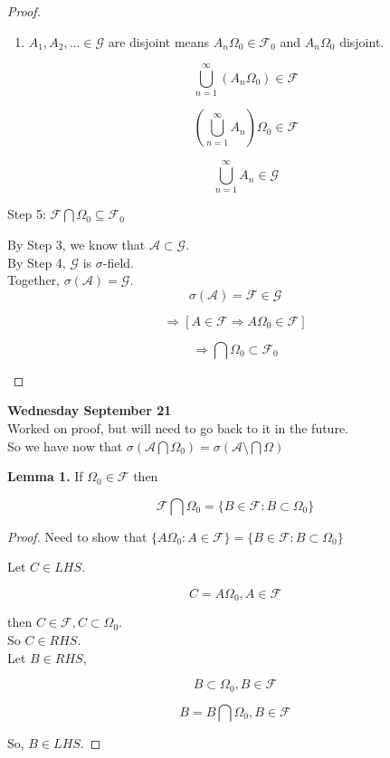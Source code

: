 \documentclass[11pt,fleqn]{book} %
\begin{document}
\begin{proof}
\begin{enumerate}[label = (\roman*)]
\begin{enumerate}
					\item $A_1,A_2, \dots \in \mathcal{G}$ are disjoint means $A_n\Omega_0 \in \mathcal{F}_0$ and $A_n\Omega_0$ disjoint.

						$$\bigcup^\infty_{n=1} (A_n \Omega_0) \in \mathcal{F} $$


						$$(\bigcup^\infty_{n=1} A_n) \Omega_0 \in \mathcal{F} $$

						$$\bigcup^\infty_{n=1} A_n \in \mathcal{G} $$


				\end{enumerate}
				

			Step 5: $\mathcal{F} \bigcap \Omega_0 \subseteq \mathcal{F}_0$

			By Step 3, we know that $\mathcal{A} \subset \mathcal{G}$.\\

			By Step 4, $\mathcal{G}$ is $\sigma$-field.\\

			Together, $\sigma(\mathcal{A}) = \mathcal{G}$.\\

			$$\sigma(\mathcal{A}) = \mathcal{F} \in \mathcal{G} $$

			$$\Rightarrow [A \in \mathcal{F} \Rightarrow A \Omega_0 \in \mathcal{F}] $$

			$$\Rightarrow \bigcap \Omega_0 \subset \mathcal{F}_0$$


	\end{enumerate}
\end{proof} 

\textbf{Wednesday September 21}\\

Worked on proof, but will need to go back to it in the future. \\


So we have now that $\sigma(\mathcal{A} \bigcap \Omega_0) = \sigma(\mathcal{A} \setminus \bigcap \Omega)$

\textbf{Lemma 1.} If $\Omega_0 \in \mathcal{F}$ then

	$$\mathcal{F} \bigcap \Omega_0 = \{B \in \mathcal{F}: B \subset \Omega_0 \} $$


\begin{proof}
	Need to show that $\{A \Omega_0: A \in \mathcal{F} \} = \{B \in \mathcal{F}: B \subset \Omega_0 \}$

	Let $C \in LHS$. 

	$$C = A \Omega_0, A \in \mathcal{F} $$

	then $C \in \mathcal{F}, C \subset \Omega_0$.\\

	So $C \in RHS$.\\

	Let $B \in RHS$, 

	$$B \subset \Omega_0, B \in \mathcal{F} $$

	$$B = B \bigcap \Omega_0,  B \in \mathcal{F}$$

	So, $B \in LHS$.
\end{proof}
	
\end{document}
